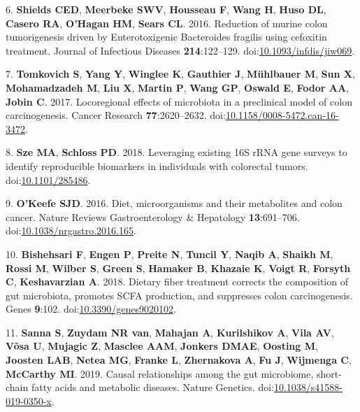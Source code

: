 \documentclass[11pt,]{article}
\begin{document}
\leavevmode\hypertarget{ref-DeStefanoShields2016}{}%
6. \textbf{Shields CED}, \textbf{Meerbeke SWV}, \textbf{Housseau F},
\textbf{Wang H}, \textbf{Huso DL}, \textbf{Casero RA}, \textbf{O'Hagan
HM}, \textbf{Sears CL}. 2016. Reduction of murine colon tumorigenesis
driven by Enterotoxigenic Bacteroides fragilis using cefoxitin
treatment. Journal of Infectious Diseases \textbf{214}:122--129.
doi:\href{https://doi.org/10.1093/infdis/jiw069}{10.1093/infdis/jiw069}.

\leavevmode\hypertarget{ref-Tomkovich2017}{}%
7. \textbf{Tomkovich S}, \textbf{Yang Y}, \textbf{Winglee K},
\textbf{Gauthier J}, \textbf{Mühlbauer M}, \textbf{Sun X},
\textbf{Mohamadzadeh M}, \textbf{Liu X}, \textbf{Martin P}, \textbf{Wang
GP}, \textbf{Oswald E}, \textbf{Fodor AA}, \textbf{Jobin C}. 2017.
Locoregional effects of microbiota in a preclinical model of colon
carcinogenesis. Cancer Research \textbf{77}:2620--2632.
doi:\href{https://doi.org/10.1158/0008-5472.can-16-3472}{10.1158/0008-5472.can-16-3472}.

\leavevmode\hypertarget{ref-Sze2018}{}%
8. \textbf{Sze MA}, \textbf{Schloss PD}. 2018. Leveraging existing 16S
rRNA gene surveys to identify reproducible biomarkers in individuals
with colorectal tumors.
doi:\href{https://doi.org/10.1101/285486}{10.1101/285486}.

\leavevmode\hypertarget{ref-OKeefe2016}{}%
9. \textbf{O'Keefe SJD}. 2016. Diet, microorganisms and their
metabolites and colon cancer. Nature Reviews Gastroenterology \&
Hepatology \textbf{13}:691--706.
doi:\href{https://doi.org/10.1038/nrgastro.2016.165}{10.1038/nrgastro.2016.165}.

\leavevmode\hypertarget{ref-Bishehsari2018}{}%
10. \textbf{Bishehsari F}, \textbf{Engen P}, \textbf{Preite N},
\textbf{Tuncil Y}, \textbf{Naqib A}, \textbf{Shaikh M}, \textbf{Rossi
M}, \textbf{Wilber S}, \textbf{Green S}, \textbf{Hamaker B},
\textbf{Khazaie K}, \textbf{Voigt R}, \textbf{Forsyth C},
\textbf{Keshavarzian A}. 2018. Dietary fiber treatment corrects the
composition of gut microbiota, promotes SCFA production, and suppresses
colon carcinogenesis. Genes \textbf{9}:102.
doi:\href{https://doi.org/10.3390/genes9020102}{10.3390/genes9020102}.

\leavevmode\hypertarget{ref-Sanna2019}{}%
11. \textbf{Sanna S}, \textbf{Zuydam NR van}, \textbf{Mahajan A},
\textbf{Kurilshikov A}, \textbf{Vila AV}, \textbf{Võsa U},
\textbf{Mujagic Z}, \textbf{Masclee AAM}, \textbf{Jonkers DMAE},
\textbf{Oosting M}, \textbf{Joosten LAB}, \textbf{Netea MG},
\textbf{Franke L}, \textbf{Zhernakova A}, \textbf{Fu J},
\textbf{Wijmenga C}, \textbf{McCarthy MI}. 2019. Causal relationships
among the gut microbiome, short-chain fatty acids and metabolic
diseases. Nature Genetics.
doi:\href{https://doi.org/10.1038/s41588-019-0350-x}{10.1038/s41588-019-0350-x}.
\end{document}
